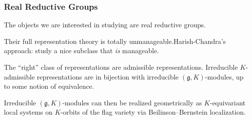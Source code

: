 \documentclass{beamer}
\begin{document}
\begin{frame}
\frametitle{Real Reductive Groups}
\noindent The objects we are interested in studying are real reductive groups.\newline

\noindent Their full representation theory is totally unmanageable.\newline Harish-Chandra's approach: study a nice subclass that {\em is} manageable.\newline

\noindent The ``right'' class of representations are \textcolor{structure}{admissible representations}. Irreducible $K$-admissible representations are in bijection with irreducible $(\mathfrak{g}, K)$-modules, up to some notion of equivalence.\newline

\noindent Irreducible $(\mathfrak{g}, K)$-modules can then be realized geometrically as $K$-equivariant local systems on $K$-orbits of the flag variety via Beilinson--Bernstein localization.\newline


\end{frame}
\end{document}
